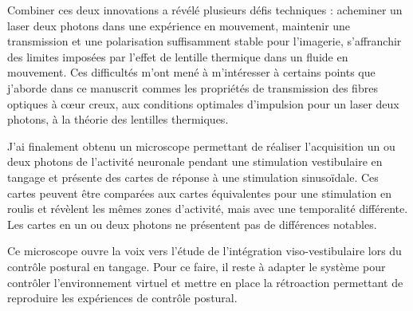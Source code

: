 Combiner ces deux innovations a révélé plusieurs défis techniques : acheminer un laser deux photons dans une expérience en mouvement, maintenir une transmission et une polarisation suffisamment stable pour l'imagerie, s'affranchir des limites imposées par l'effet de lentille thermique dans un fluide en mouvement. Ces difficultés m'ont mené à m'intéresser à certains points que j'aborde dans ce manuscrit commes les propriétés de transmission des fibres optiques à cœur creux, aux conditions optimales d'impulsion pour un laser deux photons, à la théorie des lentilles thermiques. 

J'ai finalement obtenu un microscope permettant de réaliser l'acquisition un ou deux photons de l'activité neuronale pendant une stimulation vestibulaire en tangage et présente des cartes de réponse à une stimulation sinusoïdale. Ces cartes peuvent être comparées aux cartes équivalentes pour une stimulation en roulis et révèlent les mêmes zones d'activité, mais avec une temporalité différente. Les cartes en un ou deux photons ne présentent pas de différences notables.

Ce microscope ouvre la voix vers l'étude de l'intégration viso-vestibulaire lors du contrôle postural en tangage. Pour ce faire, il reste à adapter le système pour contrôler l'environnement virtuel et mettre en place la rétroaction permettant de reproduire les expériences de contrôle postural.